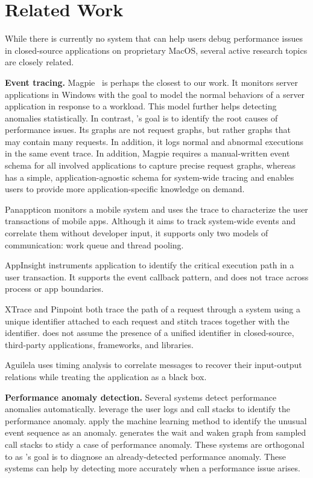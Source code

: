 \section{Related Work}

While there is currently no system that can help users debug performance
issues in closed-source applications on proprietary MacOS, several active
research topics are closely related.

\textbf{Event tracing.}  Magpie~\cite{magpie} is perhaps the closest to
our work.  It monitors server applications in Windows with the goal to
model the normal behaviors of a server application in response to a
workload.  This model further helps detecting anomalies statistically.  In
contrast, \xxx's goal is to identify the root causes of performance
issues.  Its graphs are not request graphs, but rather graphs that may
contain many requests.  In addition, it logs normal and abnormal
executions in the same event trace.  In addition, Magpie requires a
manual-written event schema for all involved applications to capture
precise request graphs, whereas \xxx has a simple, application-agnostic
schema for system-wide tracing and enables users to provide more
application-specific knowledge on demand.

Panappticon \cite{pannappticon} monitors a mobile system and uses the
trace to characterize the user transactions of mobile apps.  Although it
aims to track system-wide events and correlate them without developer
input, it supports only two models of communication: work queue and thread
pooling.

AppInsight \cite{appinsight} instruments application to identify the
critical execution path in a user transaction.  It supports the event
callback pattern, and does not trace across process or app boundaries.
                                                                                                                         
XTrace and Pinpoint \cite{xtrace, pinpoint} both trace the path of a
request through a system using a unique identifier attached to each
request and stitch traces together with the identifier.  \xxx does not
assume the presence of a unified identifier in closed-source, third-party
applications, frameworks, and libraries.
                                                                                                                         
Aguilela \cite{blackbox} uses timing analysis to correlate messages to
recover their input-output relations while treating the application as a
black box.

\textbf{Performance anomaly detection.}  Several systems detect
performance anomalies automatically.  \cite{} leverage the user logs and
call stacks to identify the performance anomaly. \cite{} apply the machine
learning method to identify the unusual event sequence as an anomaly.
\cite{} generates the wait and waken graph from sampled call stacks to
stidy a case of performance anomaly.  These systems are orthogonal to \xxx
as \xxx's goal is to diagnose an already-detected performance anomaly.
These systems can help \xxx by detecting more accurately when a
performance issue arises.
